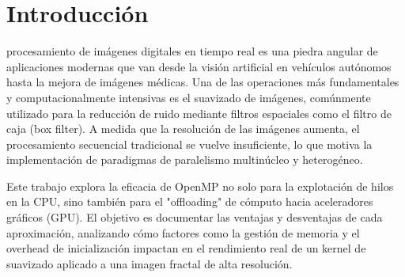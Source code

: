 \section{Introducción}
 procesamiento de imágenes digitales en tiempo real es una piedra angular de aplicaciones modernas que van desde la visión artificial en vehículos autónomos hasta la mejora de imágenes médicas. Una de las operaciones más fundamentales y computacionalmente intensivas es el suavizado de imágenes, comúnmente utilizado para la reducción de ruido mediante filtros espaciales como el filtro de caja (box filter). A medida que la resolución de las imágenes aumenta, el procesamiento secuencial tradicional se vuelve insuficiente, lo que motiva la implementación de paradigmas de paralelismo multinúcleo y heterogéneo.

Este trabajo explora la eficacia de OpenMP no solo para la explotación de hilos en la CPU, sino también para el "offloading" de cómputo hacia aceleradores gráficos (GPU). El objetivo es documentar las ventajas y desventajas de cada aproximación, analizando cómo factores como la gestión de memoria y el overhead de inicialización impactan en el rendimiento real de un kernel de suavizado aplicado a una imagen fractal de alta resolución.